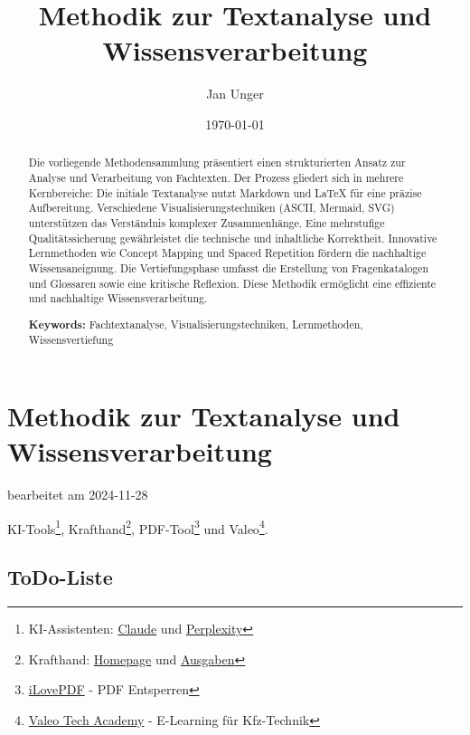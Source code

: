 \documentclass{vorlage-design-main}
\title{Methodik zur Textanalyse und Wissensverarbeitung}
\author{Jan Unger}
\date{\today}
\begin{document}
\maketitle

\begin{abstract}
Die vorliegende Methodensammlung präsentiert einen strukturierten Ansatz
zur Analyse und Verarbeitung von Fachtexten. Der Prozess gliedert sich
in mehrere Kernbereiche: Die initiale Textanalyse nutzt Markdown und
\LaTeX{} für eine präzise Aufbereitung. Verschiedene
Visualisierungstechniken (ASCII, Mermaid, SVG) unterstützen das
Verständnis komplexer Zusammenhänge. Eine mehrstufige Qualitätssicherung
gewährleistet die technische und inhaltliche Korrektheit. Innovative
Lernmethoden wie Concept Mapping und Spaced Repetition fördern die
nachhaltige Wissensaneignung. Die Vertiefungsphase umfasst die
Erstellung von Fragenkatalogen und Glossaren sowie eine kritische
Reflexion. Diese Methodik ermöglicht eine effiziente und nachhaltige
Wissensverarbeitung.

\textbf{Keywords:} Fachtextanalyse, Visualisierungstechniken,
Lernmethoden, Wissensvertiefung
\end{abstract}

\section{Methodik zur Textanalyse und
Wissensverarbeitung}\label{methodik-zur-textanalyse-und-wissensverarbeitung}

bearbeitet am 2024-11-28

KI-Tools\footnote{KI-Assistenten: \href{https://claude.ai/new}{Claude}
  und \href{https://www.perplexity.ai/}{Perplexity}},
Krafthand\footnote{Krafthand: \href{https://www.krafthand.de/}{Homepage}
  und \href{https://www.krafthand.de/service/ausgaben/}{Ausgaben}},
PDF-Tool\footnote{\href{https://www.ilovepdf.com/de/entsperren_pdf}{iLovePDF}
  - PDF Entsperren} und Valeo\footnote{\href{https://www.valeo-techacademy.com/de/learn}{Valeo
  Tech Academy} - E-Learning für Kfz-Technik}.

\subsection{ToDo-Liste}\label{todo-liste}
\end{document}
